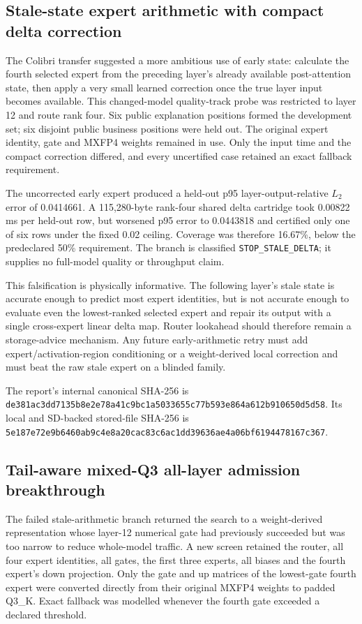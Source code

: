 \subsection{Stale-state expert arithmetic with compact delta correction}

The Colibri transfer suggested a more ambitious use of early state: calculate
the fourth selected expert from the preceding layer's already available
post-attention state, then apply a very small learned correction once the true
layer input becomes available.  This changed-model quality-track probe was
restricted to layer 12 and route rank four.  Six public explanation positions
formed the development set; six disjoint public business positions were held
out.  The original expert identity, gate and MXFP4 weights remained in use.
Only the input time and the compact correction differed, and every uncertified
case retained an exact fallback requirement.

The uncorrected early expert produced a held-out p95 layer-output-relative
$L_2$ error of 0.0414661.  A 115,280-byte rank-four shared delta cartridge took
0.00822 ms per held-out row, but worsened p95 error to 0.0443818 and certified
only one of six rows under the fixed 0.02 ceiling.  Coverage was therefore
16.67\%, below the predeclared 50\% requirement.  The branch is classified
\texttt{STOP\_STALE\_DELTA}; it supplies no full-model quality or throughput
claim.

This falsification is physically informative.  The following layer's stale
state is accurate enough to predict most expert identities, but is not accurate
enough to evaluate even the lowest-ranked selected expert and repair its output
with a single cross-expert linear delta map.  Router lookahead should therefore
remain a storage-advice mechanism.  Any future early-arithmetic retry must add
expert/activation-region conditioning or a weight-derived local correction and
must beat the raw stale expert on a blinded family.

The report's internal canonical SHA-256 is
\texttt{de381ac3dd7135b8e2e78a41c9bc1a5033655c77b593e864a612b910650d5d58}.
Its local and SD-backed stored-file SHA-256 is
\texttt{5e187e72e9b6460ab9c4e8a20cac83c6ac1dd39636ae4a06bf6194478167c367}.

\subsection{Tail-aware mixed-Q3 all-layer admission breakthrough}

The failed stale-arithmetic branch returned the search to a weight-derived
representation whose layer-12 numerical gate had previously succeeded but was
too narrow to reduce whole-model traffic.  A new screen retained the router,
all four expert identities, all gates, the first three experts, all biases and
the fourth expert's down projection.  Only the gate and up matrices of the
lowest-gate fourth expert were converted directly from their original MXFP4
weights to padded Q3\_K.  Exact fallback was modelled whenever the fourth gate
exceeded a declared threshold.

